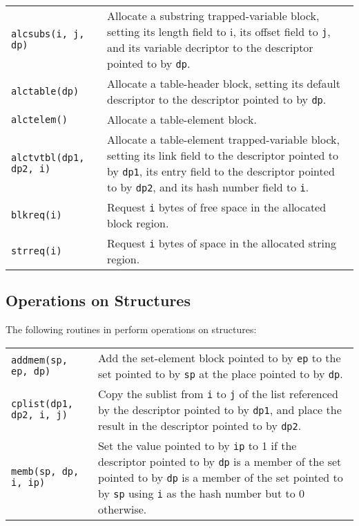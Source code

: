 {\begin{xtabular}{>{\hspace{1cm}\texttt\bgroup}l<{\egroup}@{\hspace{1cm}}p{11cm}}
alcsubs(i, j, dp) &
Allocate a substring trapped-variable block, setting its length field to
i, its offset field to \texttt{j}, and its variable decriptor to the
descriptor pointed to by \texttt{dp}.\\

alctable(dp) &
Allocate a table-header block, setting its default descriptor to the descriptor
pointed to by \texttt{dp}.\\

alctelem() &
Allocate a table-element block.\\

alctvtbl(dp1, dp2, i) &
Allocate a table-element trapped-variable block, setting its link field to the
descriptor pointed to by \texttt{dp1}, its entry field to the descriptor pointed
to by \texttt{dp2}, and its hash number field to \texttt{i}.\\

blkreq(i) &
Request \texttt{i} bytes of free space in the allocated block region.\\

\texttt{strreq(i)} &
Request \texttt{i} bytes of space in the allocated string region.\\

\end{xtabular}
}

\subsection{Operations on Structures}

The following routines in  perform operations on structures:

\begin{xtabular}{l@{\hspace{1cm}}p{11cm}}

\texttt{addmem(sp, ep, dp)} &
Add the set-element block pointed to by \texttt{ep} to the set pointed to by
\texttt{sp} at the place pointed to by \texttt{dp}.\\

\texttt{cplist(dp1, dp2, i, j)} &
Copy the sublist from \texttt{i} to \texttt{j} of the list referenced by the
descriptor pointed to by \texttt{dp1}, and place the result in the descriptor
pointed to by \texttt{dp2}.\\

\texttt{memb(sp, dp, i, ip)} &
Set the value pointed to by \texttt{ip} to 1 if the descriptor pointed to by
\texttt{dp} is a member of the set pointed to by \texttt{dp} is a member of the
set pointed to by \texttt{sp} using \texttt{i} as the hash number but to 0
otherwise.\\

\end{xtabular}

